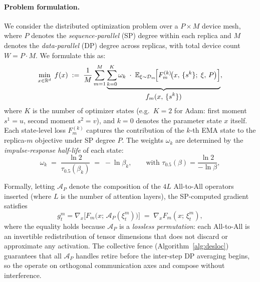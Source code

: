 \documentclass{article}
\begin{document}
\paragraph{Problem formulation.}
We consider the distributed optimization problem over a $P \times M$
device mesh, where $P$ denotes the \emph{sequence-parallel} (SP) degree
within each replica and $M$ denotes the \emph{data-parallel} (DP) degree
across replicas, with total device count $W = P \cdot M$.
We formulate this as:
\begin{equation}
\min_{x \in \mathbb{R}^d}\;
f(x) \;:=\;
\frac{1}{M}\sum_{m=1}^{M}
\underbrace{
\sum_{k=0}^{K} \omega_k \;\cdot\;
\mathbb{E}_{\xi \sim \mathcal{D}_m}\!\Bigl[
F_m^{(k)}\!\bigl(x,\,\{s^k\};\;\xi,\,P\bigr)
\Bigr]
}_{\displaystyle f_m(x,\,\{s^k\})},
\label{eq:objective}
\end{equation}
where $K$ is the number of optimizer states (e.g.\ $K{=}2$ for Adam:
first moment $s^1{=}u$, second moment $s^2{=}v$), and $k{=}0$ denotes
the parameter state $x$ itself. Each state-level loss $F_m^{(k)}$ captures
the contribution of the $k$-th EMA state to the replica-$m$ objective under
SP degree $P$. The weights $\omega_k$ are determined by the
\emph{impulse-response half-life} of each state:
\begin{equation}
\omega_k \;=\;
\frac{\ln 2}{\tau_{0.5}(\beta_k)}
\;=\; -\ln\beta_k,
\qquad
\text{with }
\tau_{0.5}(\beta) = \frac{\ln 2}{-\ln\beta},
\label{eq:omega_halflife}
\end{equation}

Formally, letting $\mathcal{A}_{P}$ denote the composition of the $4L$
All-to-All operators inserted (where $L$
is the number of attention layers), the SP-computed gradient satisfies
\begin{equation}
g_t^m = \nabla_{x}\bigl[F_m\!\bigl(x;\,\mathcal{A}_P(\xi_t^m)\bigr)\bigr]
\;=\; \nabla_{x} F_m(x;\,\xi_t^m),
\label{eq:sp_grad_equiv}
\end{equation}
where the equality holds because $\mathcal{A}_P$ is a
\emph{lossless permutation}: each All-to-All is an invertible
redistribution of tensor dimensions that does not discard or
approximate any activation. The collective fence
(Algorithm~\ref{alg:desloc}) guarantees that all $\mathcal{A}_P$
handles retire before the inter-step DP averaging begins,
so the operate
on orthogonal communication axes and compose without interference.
\end{document}
